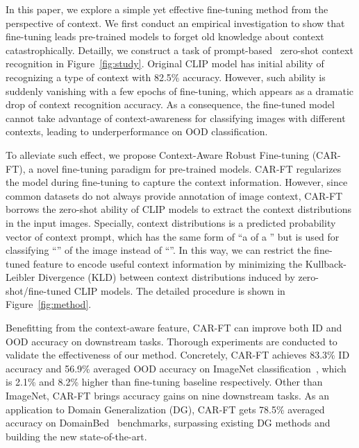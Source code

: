 \documentclass[pdflatex,sn-basic,iicol]{sn-jnl}
\theoremstyle{thmstyleone}\newtheorem{theorem}{Theorem}\newtheorem{proposition}[theorem]{Proposition}
\theoremstyle{thmstyletwo}\newtheorem{example}{Example}\newtheorem{remark}{Remark}
\theoremstyle{thmstylethree}\newtheorem{definition}{Definition}
\begin{document}
In this paper, we explore a simple yet effective fine-tuning method from the perspective of context. We first conduct an empirical investigation to show that fine-tuning leads pre-trained models to forget old knowledge about context catastrophically. Detailly, we construct a task of prompt-based~\citep{petroni2019language,liu2021pre} zero-shot context recognition in Figure~\ref{fig:study}. Original CLIP model has initial ability of recognizing a type of context with 82.5\% accuracy. However, such ability is suddenly vanishing with a few epochs of fine-tuning, which appears as a dramatic drop of context recognition accuracy. As a consequence, the fine-tuned model cannot take advantage of context-awareness for classifying images with different contexts, leading to underperformance on OOD classification. 

To alleviate such effect, we propose Context-Aware Robust Fine-tuning (CAR-FT), a novel fine-tuning paradigm for pre-trained models. CAR-FT regularizes the model during fine-tuning to capture the context information. However, since common datasets do not always provide annotation of image context, CAR-FT borrows the zero-shot ability of CLIP models to extract the context distributions in the input images. Specially, context distributions is a predicted probability vector of context prompt, which has the same form of ``a  of a '' but is used for classifying ``'' of the image instead of ``''. In this way, we can restrict the fine-tuned feature to encode useful context information by minimizing the Kullback-Leibler Divergence (KLD) between context distributions induced by zero-shot/fine-tuned CLIP models. The detailed procedure is shown in Figure~\ref{fig:method}. 

Benefitting from the context-aware feature, CAR-FT can improve both ID and OOD accuracy on downstream tasks. Thorough experiments are conducted to validate the effectiveness of our method. Concretely, CAR-FT achieves 83.3\% ID accuracy and 56.9\% averaged OOD accuracy on ImageNet classification~\citep{deng2009imagenet}, which is 2.1\% and 8.2\% higher than fine-tuning baseline respectively. Other than ImageNet, CAR-FT brings accuracy gains on nine downstream tasks. As an application to Domain Generalization (DG), CAR-FT gets 78.5\% averaged accuracy on DomainBed~\citep{gulrajani2020search} benchmarks, surpassing existing DG methods and building the new state-of-the-art.  
\end{document}
